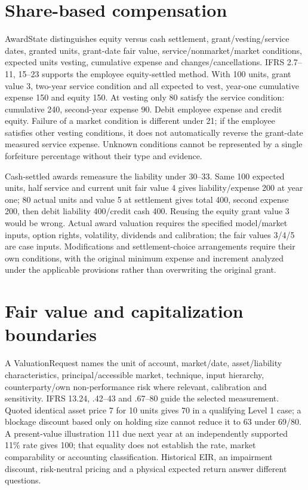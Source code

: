 \hypertarget{share-based-compensation}{%
\section{Share-based compensation}\label{method-corporate-extensions-share-based-compensation}}

AwardState distinguishes equity versus cash settlement, grant/vesting/service dates, granted units, grant-date fair value, service/nonmarket/market conditions, expected units vesting, cumulative expense and changes/cancellations. IFRS 2.7--11, 15--23 supports the employee equity-settled method. With 100 units, grant value 3, two-year service condition and all expected to vest, year-one cumulative expense 150 and equity 150. At vesting only 80 satisfy the service condition: cumulative 240, second-year expense 90. Debit employee expense and credit equity. Failure of a market condition is different under 21; if the employee satisfies other vesting conditions, it does not automatically reverse the grant-date measured service expense. Unknown conditions cannot be represented by a single forfeiture percentage without their type and evidence.

Cash-settled awards remeasure the liability under 30--33. Same 100 expected units, half service and current unit fair value 4 gives liability/expense 200 at year one; 80 actual units and value 5 at settlement gives total 400, second expense 200, then debit liability 400/credit cash 400. Reusing the equity grant value 3 would be wrong. Actual award valuation requires the specified model/market inputs, option rights, volatility, dividends and calibration; the fair values 3/4/5 are case inputs. Modifications and settlement-choice arrangements require their own conditions, with the original minimum expense and increment analyzed under the applicable provisions rather than overwriting the original grant.

\hypertarget{fair-value-and-capitalization-boundaries}{%
\section{Fair value and capitalization boundaries}\label{method-corporate-extensions-fair-value-and-capitalization-boundaries}}

A ValuationRequest names the unit of account, market/date, asset/liability characteristics, principal/accessible market, technique, input hierarchy, counterparty/own non-performance risk where relevant, calibration and sensitivity. IFRS 13.24, .42--43 and .67--80 guide the selected measurement. Quoted identical asset price 7 for 10 units gives 70 in a qualifying Level 1 case; a blockage discount based only on holding size cannot reduce it to 63 under 69/80. A present-value illustration 111 due next year at an independently supported 11\% rate gives 100; that equality does not establish the rate, market comparability or accounting classification. Historical EIR, an impairment discount, risk-neutral pricing and a physical expected return answer different questions.


